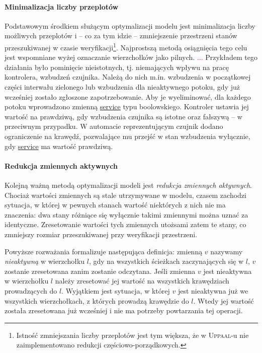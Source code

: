 \documentclass{pracamgr}
\newcommand{\todo}[1]{\textcolor{red}{#1}}
\newcommand{\upp}{\textsc{Uppaal}}
\theoremstyle{plain}
\begin{document}
\paragraph{Minimalizacja liczby przeplotów} Podstawowym środkiem
służącym optymalizacji modelu jest minimalizacja liczby możliwych
przeplotów i -- co za tym idzie -- zmniejszenie przestrzeni stanów
przeszukiwanej w czasie weryfikacji\footnote{Istność zmniejszania
  liczby przeplotów jest tym większa, że w \upp-u nie zaimplementowano
  redukcji częściowo-porządkowych.}. Najprostszą metodą osiągnięcia
tego celu jest wspomniane wyżej oznaczanie wierzchołków jako pilnych.
\todo{...}  Przykładem tego działania było pominięcie nieistotnych,
tj. niemających wpływu na pracę kontrolera, wzbudzeń czujnika. Należą
do nich m.in. wzbudzenia w początkowej części interwału zielonego lub
wzbudzenia dla nieaktywnego potoku, gdy już wcześniej zostało
zgłoszone zapotrzebowanie. Aby je wyeliminować, dla każdego potoku
wprowadzono zmienną \url{service} typu boolowskiego. Kontroler ustawia
jej wartość na prawdziwą, gdy wzbudzenia czujnika są istotne oraz
fałszywą -- w przeciwnym przypadku. W automacie reprezentującym
czujnik dodano ograniczenie na krawędź, pozwalające mu przejść w stan
wzbudzenia wyłącznie, gdy \url{service} ma wartość prawdziwą.

\paragraph{Redukcja zmiennych aktywnych} Kolejną ważną metodą
optymalizacji modeli jest \emph{redukcja zmiennych aktywnych}.
Chociaż wartości zmiennych są stale utrzymywane w modelu, czasem
zachodzi sytuacja, w której w pewnych stanach wartość niektórych z
nich nie ma znaczenia: dwa stany różniące się wyłącznie takimi
zmiennymi można uznać za identyczne. Zresetowanie wartości tych
zmiennych utożsami zatem te stany, co zmniejszy rozmiar przeszukiwanej
przy weryfikacji przestrzeni.

Powyższe rozważania formalizuje następująca definicja: zmienną $v$
nazywamy \emph{nieaktywną} w wierzchołku $l$, gdy na wszystkich
ścieżkach zaczynających się w $l$, $v$ zostanie zresetowana zanim
zostanie odczytana. Jeśli zmienna $v$ jest nieaktywna w wierzchołku
$l$ należy zresetować jej wartość na wszystkich krawędziach
prowadzących do $l$. Wyjątkiem jest sytuacja, w której $v$ jest
nieaktywna już we wszystkich wierzchołkach, z których prowadzą
krawędzie do $l$. Wtedy jej wartość została zresetowana już wcześniej
i nie ma potrzeby powtarzania tej operacji.
\end{document}
